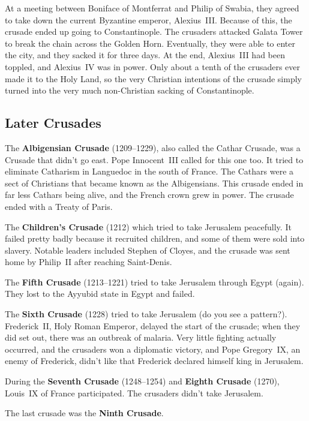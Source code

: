 At a meeting between Boniface of Montferrat and Philip of Swabia,
they agreed to take down the current Byzantine emperor, Alexius~III\@.
Because of this, the crusade ended up going to Constantinople.
The crusaders attacked Galata Tower to break the chain across the Golden Horn.
Eventually, they were able to enter the city, and they sacked it for three days.
At the end, Alexius~III had been toppled, and Alexius~IV was in power.
Only about a tenth of the crusaders ever made it to the Holy Land,
so the very Christian intentions of the crusade simply turned into the very much non-Christian sacking of Constantinople.

\subsection*{Later Crusades}

The \textbf{Albigensian Crusade} (1209--1229), also called the Cathar Crusade, was a Crusade that didn't go east.
Pope Innocent~III called for this one too.
It tried to eliminate Catharism in Languedoc in the south of France.
The Cathars were a sect of Christians that became known as the Albigensians.
This crusade ended in far less Cathars being alive, and the French crown grew in power.
The crusade ended with a Treaty of Paris.

The \textbf{Children's Crusade} (1212) which tried to take Jerusalem peacefully.
It failed pretty badly because it recruited children, and some of them were sold into slavery.
Notable leaders included Stephen of Cloyes, and the crusade was sent home by Philip~II after reaching Saint-Denis.

The \textbf{Fifth Crusade} (1213--1221) tried to take Jerusalem through Egypt (again).
They lost to the Ayyubid state in Egypt and failed.

The \textbf{Sixth Crusade} (1228) tried to take Jerusalem (do you see a pattern?).
Frederick~II, Holy Roman Emperor, delayed the start of the crusade;
when they did set out, there was an outbreak of malaria.
Very little fighting actually occurred, and the crusaders won a diplomatic victory,
and Pope Gregory~IX, an enemy of Frederick, didn't like that Frederick declared himself king in Jerusalem.

During the \textbf{Seventh Crusade} (1248--1254) and \textbf{Eighth Crusade} (1270), Louis~IX of France participated.
The crusaders didn't take Jerusalem.

The last crusade was the \textbf{Ninth Crusade}.

